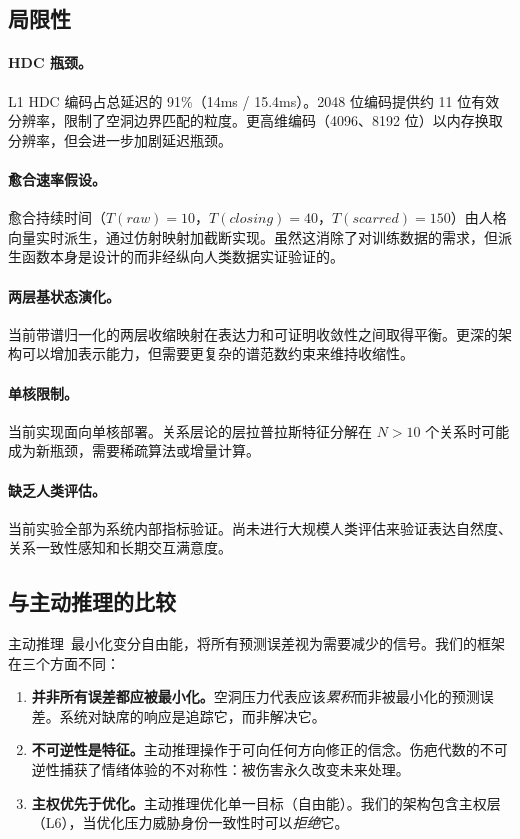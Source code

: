 \documentclass[11pt]{article}
\begin{document}
\subsection{局限性}

\paragraph{HDC 瓶颈。}L1 HDC 编码占总延迟的 91\%（14ms / 15.4ms）。2048 位编码提供约 11 位有效分辨率，限制了空洞边界匹配的粒度。更高维编码（4096、8192 位）以内存换取分辨率，但会进一步加剧延迟瓶颈。

\paragraph{愈合速率假设。}愈合持续时间（$T(raw)=10$，$T(closing)=40$，$T(scarred)=150$）由人格向量实时派生，通过仿射映射加截断实现。虽然这消除了对训练数据的需求，但派生函数本身是设计的而非经纵向人类数据实证验证的。

\paragraph{两层基状态演化。}当前带谱归一化的两层收缩映射在表达力和可证明收敛性之间取得平衡。更深的架构可以增加表示能力，但需要更复杂的谱范数约束来维持收缩性。

\paragraph{单核限制。}当前实现面向单核部署。关系层论的层拉普拉斯特征分解在 $N > 10$ 个关系时可能成为新瓶颈，需要稀疏算法或增量计算。

\paragraph{缺乏人类评估。}当前实验全部为系统内部指标验证。尚未进行大规模人类评估来验证表达自然度、关系一致性感知和长期交互满意度。

\subsection{与主动推理的比较}

主动推理~\cite{friston2010}最小化变分自由能，将所有预测误差视为需要减少的信号。我们的框架在三个方面不同：
\begin{enumerate}
\item \textbf{并非所有误差都应被最小化。}空洞压力代表应该\emph{累积}而非被最小化的预测误差。系统对缺席的响应是追踪它，而非解决它。
\item \textbf{不可逆性是特征。}主动推理操作于可向任何方向修正的信念。伤疤代数的不可逆性捕获了情绪体验的不对称性：被伤害永久改变未来处理。
\item \textbf{主权优先于优化。}主动推理优化单一目标（自由能）。我们的架构包含主权层（L6），当优化压力威胁身份一致性时可以\emph{拒绝}它。
\end{enumerate}
\end{document}
